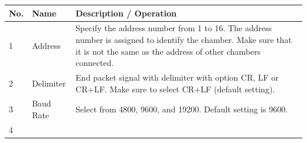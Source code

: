 \begin{longtable}[]{@{}lll@{}}
\toprule
\begin{minipage}[b]{0.04\columnwidth}\raggedright
No.\strut
\end{minipage} & \begin{minipage}[b]{0.23\columnwidth}\raggedright
Name\strut
\end{minipage} & \begin{minipage}[b]{0.65\columnwidth}\raggedright
Description / Operation\strut
\end{minipage}\tabularnewline
\midrule
\endhead
\begin{minipage}[t]{0.04\columnwidth}\raggedright
1\strut
\end{minipage} & \begin{minipage}[t]{0.23\columnwidth}\raggedright
Address\strut
\end{minipage} & \begin{minipage}[t]{0.65\columnwidth}\raggedright
Specify the address number from 1 to 16. The address number is assigned
to identify the chamber. Make sure that it is not the same as the
address of other chambers connected.\strut
\end{minipage}\tabularnewline
\begin{minipage}[t]{0.04\columnwidth}\raggedright
2\strut
\end{minipage} & \begin{minipage}[t]{0.23\columnwidth}\raggedright
Delimiter\strut
\end{minipage} & \begin{minipage}[t]{0.65\columnwidth}\raggedright
End packet signal with delimiter with option CR, LF or CR+LF. Make sure
to select CR+LF (default setting).\strut
\end{minipage}\tabularnewline
\begin{minipage}[t]{0.04\columnwidth}\raggedright
3\strut
\end{minipage} & \begin{minipage}[t]{0.23\columnwidth}\raggedright
Baud Rate\strut
\end{minipage} & \begin{minipage}[t]{0.65\columnwidth}\raggedright
Select from 4800, 9600, and 19200. Default setting is 9600.\strut
\end{minipage}\tabularnewline
\begin{minipage}[t]{0.04\columnwidth}\raggedright
4\strut
\end{minipage} & \begin{minipage}[t]{0.23\columnwidth}\raggedright

\end{minipage}
\end{longtable}
